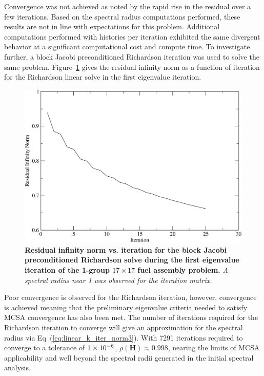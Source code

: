 Convergence was not achieved as noted by the rapid rise in the
residual over a few iterations. Based on the spectral radius
computations performed, these results are not in line with
expectations for this problem. Additional computations performed with
 histories per iteration exhibited the same divergent
behavior at a significant computational cost and compute time. To
investigate further, a block Jacobi preconditioned Richardson
iteration was used to solve the same
problem. Figure~\ref{fig:block_jacobi_res_richardson} gives the
residual infinity norm as a function of iteration for the Richardson
linear solve in the first eigenvalue iteration.
\begin{figure}[t!]
  \begin{center}
    \includegraphics[width=5in]{chapters/spn_equations/block_jacobi_rich_res.pdf}
  \end{center}
  \caption{\textbf{Residual infinity norm vs. iteration for the block
      Jacobi preconditioned Richardson solve during the first
      eigenvalue iteration of the 1-group $17 \times 17$ fuel assembly
      problem.} \textit{A spectral radius near 1 was observed for the
      iteration matrix.}}
  \label{fig:block_jacobi_res_richardson}
\end{figure}
Poor convergence is observed for the Richardson iteration, however,
convergence is achieved meaning that the preliminary eigenvalue
criteria needed to satisfy MCSA convergence has also been met. The
number of iterations required for the Richardson iteration to converge
will give an approximation for the spectral radius via
Eq~(\ref{eq:linear_k_iter_norm3}). With 7291 iterations required to
converge to a tolerance of $1\times 10^{-6}$, $\rho(\mathbf{H}) \approx
0.998$, nearing the limits of MCSA applicability and well beyond the
spectral radii generated in the initial spectral analysis.

